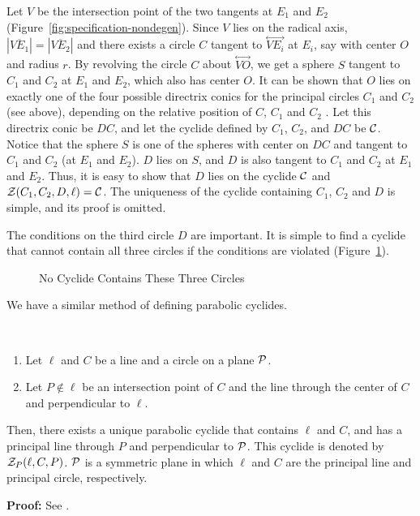 Let $V$ be the intersection point of the two tangents at $E_1$ and $E_2$
(Figure~\ref{fig:specification-nondegen}).  
Since $V$ lies on the radical axis, 
$|\overline{VE_1}|=|\overline{VE_2}|$ and there exists a circle $C$
tangent to $\stackrel{\longleftrightarrow}{VE_i}$ at $E_i$,
say with center $O$ and radius $r$.
By revolving the circle $C$ about $\stackrel{\longleftrightarrow}{VO}$,
we get a sphere $S$ tangent to $C_1$ and $C_2$ at $E_1$ and $E_2$,
which also has center $O$.
It can be shown that $O$ lies on exactly one of the four possible directrix
conics for the principal circles $C_1$ and $C_2$ (see above),
depending on the relative position of $C$, $C_1$ and $C_2$ 
\cite[Lemma~5.3]{shenethesis}.
Let this directrix conic be $DC$, and let the cyclide defined by
$C_1$, $C_2$, and $DC$ be ${\cal C}$.
Notice that the sphere $S$ is one of the spheres with center on $DC$
and tangent to $C_1$ and $C_2$ (at $E_1$ and $E_2$).
$D$ lies on $S$, and $D$ is also tangent to $C_1$ and $C_2$ 
at $E_1$ and $E_2$.
Thus, it is easy to show that $D$ lies on the cyclide ${\cal C}$ and
${\cal Z}(C_1,C_2,D,\ell) = {\cal C}$.
The uniqueness of the cyclide containing $C_1$, $C_2$ and $D$ is simple,
and its proof is omitted.
\QED

\begin{remark} \rm
The conditions on the third circle $D$ are important.
It is simple to find a cyclide that cannot contain all three circles if
the conditions are violated (Figure~\ref{fig:wrong-example}).
\end{remark}

\begin{figure}
\vspace{5.5cm}
\caption{No Cyclide Contains These Three Circles}
\label{fig:wrong-example}
\end{figure}

\noindent We have a similar method of defining parabolic cyclides.

\newpage

\begin{lemma}
\label{lemma:para-construction} \ 
\begin{enumerate}
     \item Let $\ell$ and $C$ be a line and a circle on a plane ${\cal P}$.  
     \item Let $P\not\in\ell$ be an intersection point of $C$ and the 
          line through the center of $C$ and perpendicular to $\ell$.  
\end{enumerate}
Then, there exists a unique parabolic cyclide that contains $\ell$ and $C$,
and has a principal line through $P$ and perpendicular to ${\cal P}$.  
This cyclide is denoted by ${\cal Z}_P(\ell,C,P)$.
${\cal P}$ is a symmetric plane in which $\ell$ and $C$ are the 
principal line and principal circle, respectively.  
\end{lemma}
{\bf Proof:}
See \cite[Lemma~5.5]{shenethesis}.
\QED

